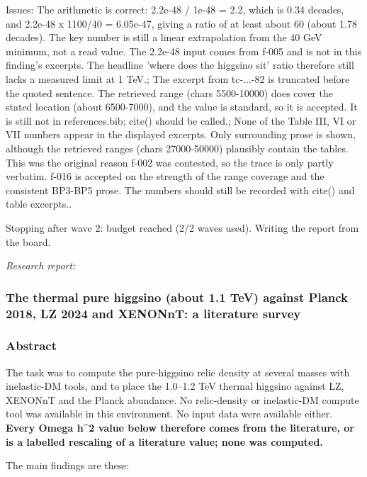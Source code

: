 \documentclass[11pt,a4paper]{article}
\begin{document}
Issues: The arithmetic is correct: 2.2e-48 / 1e-48 = 2.2, which is 0.34 decades, and 2.2e-48 x 1100/40 = 6.05e-47, giving a ratio of at least about 60 (about 1.78 decades). The key number is still a linear extrapolation from the 40 GeV minimum, not a read value. The 2.2e-48 input comes from f-005 and is not in this finding's excerpts. The headline 'where does the higgsino sit' ratio therefore still lacks a measured limit at 1 TeV.; The excerpt from tc-...-82 is truncated before the quoted sentence. The retrieved range (chars 5500-10000) does cover the stated location (about 6500-7000), and the value is standard, so it is accepted. It is still not in references.bib; cite() should be called.; None of the Table III, VI or VII numbers appear in the displayed excerpts. Only surrounding prose is shown, although the retrieved ranges (chars 27000-50000) plausibly contain the tables. This was the original reason f-002 was contested, so the trace is only partly verbatim. f-016 is accepted on the strength of the range coverage and the consistent BP3-BP5 prose. The numbers should still be recorded with cite() and table excerpts..

Stopping after wave 2: budget reached (2/2 waves used). Writing the report from the board.

\textit{Research report:}\par
\subsubsection*{The thermal pure higgsino (about 1.1 TeV) against Planck 2018, LZ 2024 and XENONnT: a literature survey}
\subsubsection*{Abstract}
The task was to compute the pure-higgsino relic density at several masses with inelastic-DM tools, and to place the 1.0--1.2 TeV thermal higgsino against LZ, XENONnT and the Planck abundance. No relic-density or inelastic-DM compute tool was available in this environment. No input data were available either. \textbf{Every Omega h\textasciicircum{}2 value below therefore comes from the literature, or is a labelled rescaling of a literature value; none was computed.}

The main findings are these:
\end{document}
